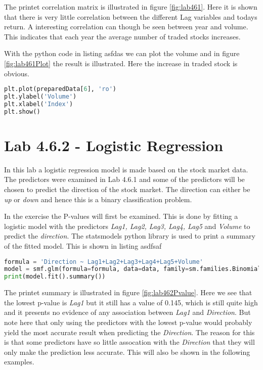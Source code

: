 The printet correlation matrix is illustrated in figure \ref{fig:lab461}. Here it is shown that there is very little correlation between the different Lag variables and todays return. A interesting correlation can though be seen between year and volume. This indicates that each year the average number of traded stocks increases. 

\FloatBarrier

With the python code in listing asfdas we can plot the volume and in figure \ref{fig:lab461Plot} the result is illustrated. Here the increase in traded stock is obvious.
\begin{lstlisting}[language=Python, caption=print correlation matrix]
plt.plot(preparedData[6], 'ro')
plt.ylabel('Volume')
plt.xlabel('Index')
plt.show()
\end{lstlisting}


\section{Lab 4.6.2 - Logistic Regression}
In this lab a logistic regression model is made based on the stock market data. The predictors were examined in Lab 4.6.1 and some of the predictors will be chosen to predict the direction of the stock market. The direction can either be \emph{up} or \emph{down} and hence this is a binary classification problem.

In the exercise the P-values will first be examined. This is done by fitting a logistic model with the predictors \emph{Lag1, Lag2, Lag3, Lag4, Lag5} and \emph{Volume} to predict the \emph{direction}.  The statsmodels python library is used to print a summary of the fitted model. This is shown in listing asdfsaf
\begin{lstlisting}[language=Python, caption=print correlation matrix]
formula = 'Direction ~ Lag1+Lag2+Lag3+Lag4+Lag5+Volume'
model = smf.glm(formula=formula, data=data, family=sm.families.Binomial())
print(model.fit().summary())
\end{lstlisting}


The printet summary is illustrated in figure \ref{fig:lab462Pvalue}. Here we see that the lowest p-value is \emph{Lag1} but it still has a value of 0.145, which is still quite high and it presents no evidence of any association between \emph{Lag1} and \emph{Direction}. But note here that only using the predictors with the lowest p-value would probably yield the most accurate result when predicting the \emph{Direction}. The reason for this is that some predictors have so little assocation with the \emph{Direction} that they will only make the prediction less accurate. This will also be shown in the following examples.

